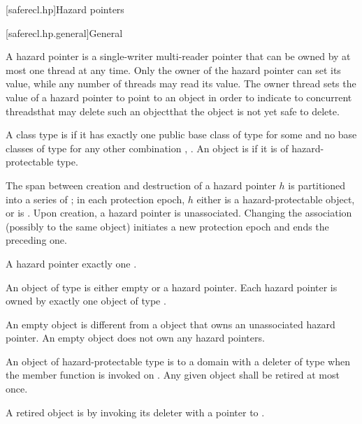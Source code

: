 
[saferecl.hp]{Hazard pointers}

[saferecl.hp.general]{General}

\pnum
A hazard pointer is a single-writer multi-reader pointer that can be owned by at most one thread at any time. Only the owner of the hazard pointer can set its value, while any number of threads may read its value. The owner thread sets the value of a hazard pointer to point to an object in order to indicate to concurrent threads\textemdash that may delete such an object\textemdash that the object is not yet safe to delete.

\pnum
A class type  is  if it has exactly one public base class of type  for some  and no base classes of type  for any other combination , . An object is  if it is of hazard-protectable type.

\pnum
The span between creation and destruction of a hazard pointer $h$ is partitioned into a series of ; in each protection epoch, $h$ either is  a hazard-protectable object, or is . Upon creation, a hazard pointer is unassociated. Changing the association (possibly to the same object) initiates a new protection epoch and ends the preceding one.

\pnum
A hazard pointer  exactly one . 

\pnum
An object of type  is either empty or  a hazard pointer. Each hazard pointer is owned by exactly one object of type . \begin{note} An empty  object is different from a  object that owns an unassociated hazard pointer. An empty  object does not own any hazard pointers. \end{note}

\pnum
An object  of hazard-protectable type  is  to a domain with a deleter of type  when the member function  is invoked on . Any given object  shall be retired at most once.

\pnum
A retired object  is  by invoking its deleter with a pointer to .


